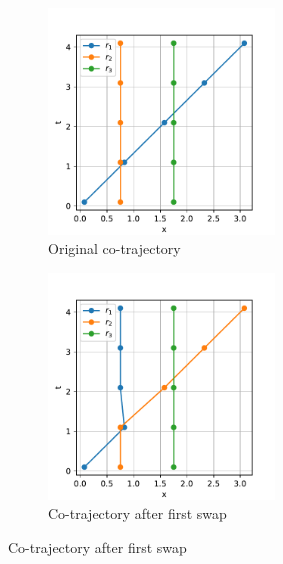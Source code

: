 \documentclass[12pt]{article}
\theoremstyle{definition}
\begin{document}
\begin{figure}
    \centering
    \begin{subfigure}[t]{0.45\textwidth}
      \includegraphics[width=6cm]{swap-order-a.pdf}
      \caption{Original co-trajectory}
      \label{fig:swap-order-a}
    \end{subfigure}
    \begin{subfigure}[t]{0.45\textwidth}
      \includegraphics[width=6cm]{swap-order-b.pdf}
      \caption{Co-trajectory after first swap}
      \label{fig:swap-order-b}
    \end{subfigure}


\end{figure}
\end{document}
